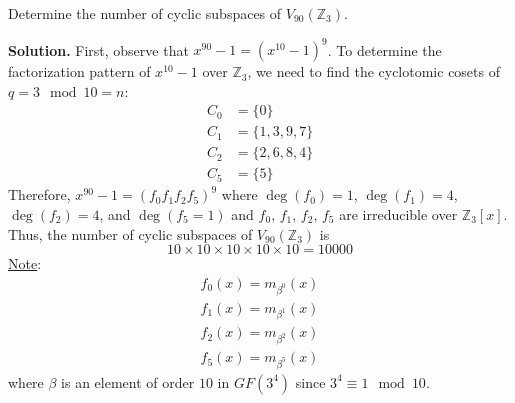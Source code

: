 \begin{exbox}
    \begin{example}
        Determine the number of cyclic subspaces of $ V_{90}(\mathbb{Z}_3) $.

        \textbf{Solution.} First, observe that $ x^{90}-1=(x^{10}-1)^9 $.
        To determine the factorization pattern of $ x^{10}-1 $
        over $ \mathbb{Z}_3 $, we need to find the cyclotomic cosets
        of $ q=3\mod 10=n $:
        \begin{align*}
            C_0 & =\{0\}       \\
            C_1 & =\{1,3,9,7\} \\
            C_2 & =\{2,6,8,4\} \\
            C_5 & =\{5\}
        \end{align*}
        Therefore, $ x^{90}-1=(f_0f_1f_2f_5)^9 $ where
        $ \deg(f_0)=1 $, $ \deg(f_1)=4 $, $ \deg(f_2)=4 $, and $ \deg(f_5=1) $
        and $ f_0,\,f_1,\,f_2,\,f_5 $ are irreducible over $ \mathbb{Z}_3[x] $.
        Thus, the number of cyclic subspaces of $ V_{90}(\mathbb{Z}_3) $
        is
        \[ 10\times 10\times 10\times 10\times 10=10 000 \]
        \underline{Note}:
        \begin{align*}
            f_0(x)=m_{\beta^0}(x) \\
            f_1(x)=m_{\beta^1}(x) \\
            f_2(x)=m_{\beta^2}(x) \\
            f_5(x)=m_{\beta^5}(x)
        \end{align*}
        where $ \beta $ is an element of order $ 10 $ in $ GF(3^4) $
        since $ 3^4\equiv 1\mod 10 $.
    \end{example}
\end{exbox}
